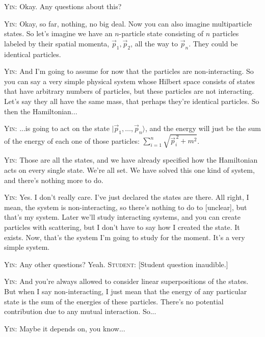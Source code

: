 \noindent\textsc{Yin:} Okay. Any questions about this?\par

\noindent\textsc{Yin:} Okay, so far, nothing, no big deal. Now you can also imagine multiparticle states. So let's imagine we have an $n$-particle state consisting of $n$ particles labeled by their spatial momenta, $\vec p_1,\vec p_2$, all the way to $\vec p_n$. They could be identical particles.\par

\noindent\textsc{Yin:} And I'm going to assume for now that the particles are non-interacting. So you can say a very simple physical system whose Hilbert space consists of states that have arbitrary numbers of particles, but these particles are not interacting. Let's say they all have the same mass, that perhaps they're identical particles. So then the Hamiltonian...\par

\noindent\textsc{Yin:} ...is going to act on the state $|\vec p_1,\ldots,\vec p_n\rangle$, and the energy will just be the sum of the energy of each one of those particles: $\sum_{i=1}^{n}\sqrt{\vec p_i^{\,2}+m^2}$.\par

\noindent\textsc{Yin:} Those are all the states, and we have already specified how the Hamiltonian acts on every single state. We're all set. We have solved this one kind of system, and there's nothing more to do.\par

\noindent\textsc{Yin:} Yes. I don't really care. I've just declared the states are there. All right, I mean, the system is non-interacting, so there's nothing to do to [unclear], but that's my system. Later we'll study interacting systems, and you can create particles with scattering, but I don't have to say how I created the state. It exists. Now, that's the system I'm going to study for the moment. It's a very simple system.\par

\noindent\textsc{Yin:} Any other questions? Yeah. \textsc{Student:} [Student question inaudible.]\par

\noindent\textsc{Yin:} And you're always allowed to consider linear superpositions of the states. But when I say non-interacting, I just mean that the energy of any particular state is the sum of the energies of these particles. There's no potential contribution due to any mutual interaction. So...\par

\noindent\textsc{Yin:} Maybe it depends on, you know...\par
